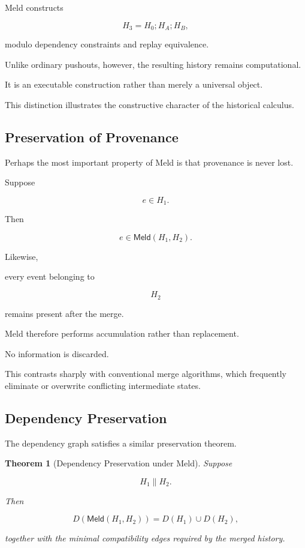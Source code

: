 \documentclass[12pt,oneside]{article}
\newtheorem{theorem}{Theorem}[section]
\theoremstyle{definition}
\theoremstyle{remark}
\newcommand{\Meld}{\mathsf{Meld}}
\begin{document}
Meld constructs

\[
H_3
=
H_0;
H_A;
H_B,
\]

modulo dependency constraints and replay equivalence.

Unlike ordinary pushouts, however, the resulting history remains computational.

It is an executable construction rather than merely a universal object.

This distinction illustrates the constructive character of the historical
calculus.

\subsection{Preservation of Provenance}

Perhaps the most important property of Meld is that provenance is never lost.

Suppose

\[
e
\in
H_1.
\]

Then

\[
e
\in
\Meld(H_1,H_2).
\]

Likewise,

every event belonging to

\[
H_2
\]

remains present after the merge.

Meld therefore performs accumulation rather than replacement.

No information is discarded.

This contrasts sharply with conventional merge algorithms, which frequently
eliminate or overwrite conflicting intermediate states.

\subsection{Dependency Preservation}

The dependency graph satisfies a similar preservation theorem.

\begin{theorem}[Dependency Preservation under Meld]

Suppose

\[
H_1
\parallel
H_2.
\]

Then

\[
D(\Meld(H_1,H_2))
=
D(H_1)
\cup
D(H_2),
\]

together with the minimal compatibility edges required by the merged history.

\end{theorem}
\end{document}
